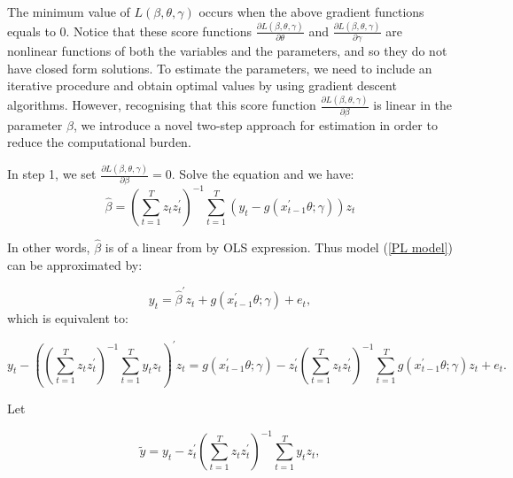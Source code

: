 \documentclass[a4paper,12pt,times,numbered,print,index]{report}
\numberwithin{equation}{section}
\begin{document}
The minimum value of $L(\beta, \theta, \gamma)$ occurs when the above gradient functions equals to 0. Notice that these score functions $\frac{\partial L(\beta, \theta, \gamma)}{\partial \theta}$ and $\frac{\partial L(\beta, \theta, \gamma)}{\partial \gamma}$ are nonlinear functions of both the variables and the parameters, and so they do not have closed form solutions. To estimate the parameters, we need to include an iterative procedure and obtain optimal values by using gradient descent algorithms. However, recognising that this score function $\frac{\partial L(\beta, \theta, \gamma)}{\partial \beta}$ is linear in the parameter $\beta$, we introduce a novel two-step approach for estimation in order to reduce the computational burden. 

In step 1, we set $\frac{\partial L(\beta, \theta, \gamma)}{\partial \beta} = 0$. Solve the equation and we have:
\begin{equation}
\hat{\beta} = \left( \sum_{t=1}^{T}z_t z_t^{\prime}\right)^{-1}\sum_{t=1}^{T}\left( y_t - g\left( x_{t-1}^{\prime }\theta; \gamma\right)\right) z_t
\label{beta}
\end{equation}

In other words, $\hat{\beta}$ is of a linear from by OLS expression. Thus model (\ref{PL model}) can be approximated by:

$$
y_t = \hat{\beta}^{\prime} z_t + g\left( x_{t-1}^{\prime }\theta; \gamma\right) +e_{t},
$$
which is equivalent to:

$$
y_t - \left( \left( \sum_{t=1}^{T}z_t z_t^{\prime}\right)^{-1} \sum_{t=1}^{T}y_t z_t \right) ^{\prime} z_t = g\left( x_{t-1}^{\prime }\theta; \gamma\right) - z_t^{\prime} \left( \sum_{t=1}^{T}z_t z_t^{\prime}\right)^{-1} \sum_{t=1}^{T} g\left( x_{t-1}^{\prime }\theta; \gamma\right) z_t + e_t.
$$

Let  

$$\tilde{y} = y_t -  z_t^{\prime}  \left( \sum_{t=1}^{T}z_t z_t^{\prime}\right)^{-1} \sum_{t=1}^{T}y_t z_t, $$ 
\end{document}
